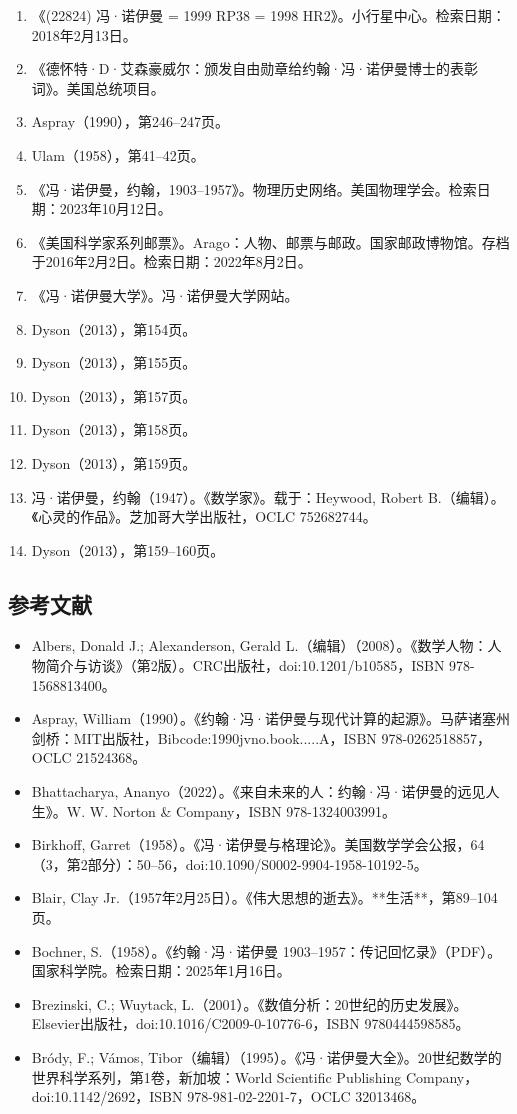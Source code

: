 \begin{enumerate}
\item 《(22824) 冯·诺伊曼 = 1999 RP38 = 1998 HR2》。小行星中心。检索日期：2018年2月13日。  
\item 《德怀特·D·艾森豪威尔：颁发自由勋章给约翰·冯·诺伊曼博士的表彰词》。美国总统项目。  
\item Aspray（1990），第246–247页。  
\item Ulam（1958），第41–42页。  
\item 《冯·诺伊曼，约翰，1903–1957》。物理历史网络。美国物理学会。检索日期：2023年10月12日。  
\item 《美国科学家系列邮票》。Arago：人物、邮票与邮政。国家邮政博物馆。存档于2016年2月2日。检索日期：2022年8月2日。  
\item 《冯·诺伊曼大学》。冯·诺伊曼大学网站。  
\item Dyson（2013），第154页。  
\item Dyson（2013），第155页。  
\item Dyson（2013），第157页。  
\item Dyson（2013），第158页。  
\item Dyson（2013），第159页。  
\item 冯·诺伊曼，约翰（1947）。《数学家》。载于：Heywood, Robert B.（编辑）。《心灵的作品》。芝加哥大学出版社，OCLC 752682744。  
\item Dyson（2013），第159–160页。
\end{enumerate}
\subsection{参考文献}
\begin{itemize}
\item Albers, Donald J.; Alexanderson, Gerald L.（编辑）（2008）。《数学人物：人物简介与访谈》（第2版）。CRC出版社，doi:10.1201/b10585，ISBN 978-1568813400。  
\item Aspray, William（1990）。《约翰·冯·诺伊曼与现代计算的起源》。马萨诸塞州剑桥：MIT出版社，Bibcode:1990jvno.book.....A，ISBN 978-0262518857，OCLC 21524368。  
\item Bhattacharya, Ananyo（2022）。《来自未来的人：约翰·冯·诺伊曼的远见人生》。W. W. Norton & Company，ISBN 978-1324003991。  
\item Birkhoff, Garret（1958）。《冯·诺伊曼与格理论》。美国数学学会公报，64（3，第2部分）：50–56，doi:10.1090/S0002-9904-1958-10192-5。  
\item Blair, Clay Jr.（1957年2月25日）。《伟大思想的逝去》。**生活**，第89–104页。  
\item Bochner, S.（1958）。《约翰·冯·诺伊曼 1903–1957：传记回忆录》（PDF）。国家科学院。检索日期：2025年1月16日。  
\item Brezinski, C.; Wuytack, L.（2001）。《数值分析：20世纪的历史发展》。Elsevier出版社，doi:10.1016/C2009-0-10776-6，ISBN 9780444598585。  
\item Bródy, F.; Vámos, Tibor（编辑）（1995）。《冯·诺伊曼大全》。20世纪数学的世界科学系列，第1卷，新加坡：World Scientific Publishing Company，doi:10.1142/2692，ISBN 978-981-02-2201-7，OCLC 32013468。
\end{itemize}

